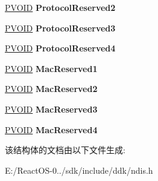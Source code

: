 \begin{DoxyCompactItemize}
\hyperlink{interfacevoid}{P\+V\+O\+ID} {\bfseries Protocol\+Reserved2}
\item 
\mbox{\label{struct___n_d_i_s___w_a_n___p_a_c_k_e_t_a205b5969a6568ece10795eb7d089e835}} 
\hyperlink{interfacevoid}{P\+V\+O\+ID} {\bfseries Protocol\+Reserved3}
\item 
\mbox{\label{struct___n_d_i_s___w_a_n___p_a_c_k_e_t_a8df9f9c9b61582bef9ffad4b492f80c9}} 
\hyperlink{interfacevoid}{P\+V\+O\+ID} {\bfseries Protocol\+Reserved4}
\item 
\mbox{\label{struct___n_d_i_s___w_a_n___p_a_c_k_e_t_a496c8e7f6f8f06a7c2199f096221e2f2}} 
\hyperlink{interfacevoid}{P\+V\+O\+ID} {\bfseries Mac\+Reserved1}
\item 
\mbox{\label{struct___n_d_i_s___w_a_n___p_a_c_k_e_t_ae5a4c44d045d3adfe1ebbe8ff7d4592d}} 
\hyperlink{interfacevoid}{P\+V\+O\+ID} {\bfseries Mac\+Reserved2}
\item 
\mbox{\label{struct___n_d_i_s___w_a_n___p_a_c_k_e_t_a0ebb7e187418de0423efbb01bb59c452}} 
\hyperlink{interfacevoid}{P\+V\+O\+ID} {\bfseries Mac\+Reserved3}
\item 
\mbox{\label{struct___n_d_i_s___w_a_n___p_a_c_k_e_t_aac94a67cf0aca187429626902d8a26bc}} 
\hyperlink{interfacevoid}{P\+V\+O\+ID} {\bfseries Mac\+Reserved4}
\end{DoxyCompactItemize}


该结构体的文档由以下文件生成\+:\begin{DoxyCompactItemize}
\item 
E\+:/\+React\+O\+S-\/0../sdk/include/ddk/ndis.\+h\end{DoxyCompactItemize}
